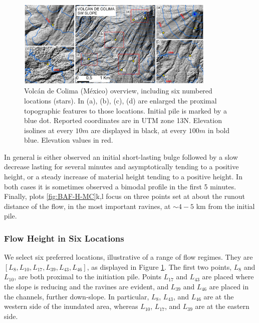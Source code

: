 \documentclass{article}
\begin{document}
\begin{figure}[H]
         \centering
        \includegraphics[width=0.85\textwidth]{FigExtra.jpg}
        \caption{Volc{\'a}n de Colima (M{\'e}xico) overview, including six numbered locations (stars). In (a), (b), (c), (d) are enlarged the proximal topographic features to those locations. Initial pile is marked by a blue dot. Reported coordinates are in UTM zone 13N. Elevation isolines at every $10 m$ are displayed in black, at every $100m$ in bold blue. Elevation values in red.}
        \label{fig:Colima-extra}
\end{figure}

In general is either observed an initial short-lasting bulge followed by a slow decrease lasting for several minutes and asymptotically tending to a positive height, or a steady increase of material height tending to a positive height. In both cases it is sometimes observed a bimodal profile in the first 5 minutes. Finally, plots \ref{fig:BAF-H-MC}k,l focus on three points set at about the runout distance of the flow, in the most important ravines, at $\sim 4-5$ km from the initial pile. %

\subsubsection{Flow Height in Six Locations}\label{Obs2}
We select six preferred locations, illustrative of a range of flow regimes. They are $[L_8, L_{10}, L_{17}, L_{39}, L_{43}, L_{46}]$, as displayed in Figure \ref{fig:Colima-extra}. The first two points, $L_8$ and $L_{10}$, are both proximal to the initiation pile. Points $L_{17}$ and $L_{43}$ are placed where the slope is reducing and the ravines are evident, and $L_{39}$ and $L_{46}$ are placed in the channels, further down-slope. In particular, $L_8$, $L_{43}$, and $L_{46}$ are at the western side of the inundated area, whereas $L_{10}$, $L_{17}$, and $L_{39}$ are at the eastern side.
\end{document}
